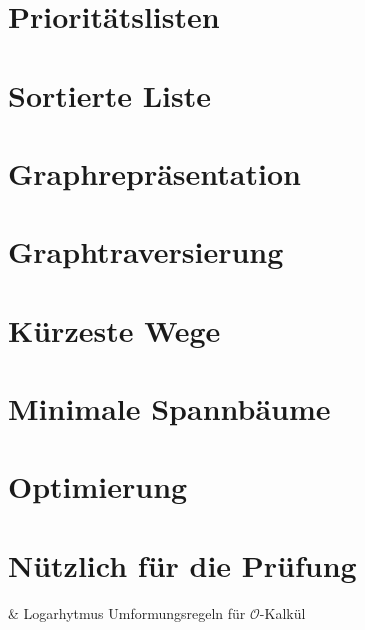\documentclass[a4paper]{scrartcl}
\begin{document}
	
			
			
		
\section[Immer die Übersicht behalten]{Prioritätslisten}
\section[Die eierlegende Wollmilchsau]{Sortierte Liste}
\section[Beziehungen im Griff haben]{Graphrepräsentation}
\section[Globalen Dingen auf der Spur]{Graphtraversierung}
\section[Schnellstens zum Ziel]{Kürzeste Wege}
\section[Immer gut verbunden]{Minimale Spannbäume}
\section[Noch mehr Entwurfsmethoden]{Optimierung}
\section{Nützlich für die Prüfung}
	\begin{easylist}
		& Logarhytmus Umformungsregeln für \(\mathcal{O}\)-Kalkül
	\end{easylist}
\end{document}
